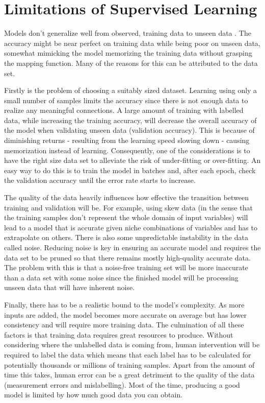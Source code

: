 \documentclass[10pt,a4paper]{report}
\begin{document}
		\section{Limitations of Supervised Learning}
			Models don't generalize well from observed, training data to unseen data \autocite[p. 1-3]{OverfittingSupervisedLearning}. The accuracy might be near perfect
			on training data while being poor on unseen data, somewhat mimicking the model memorizing the training data without grasping the mapping function. 	Many of the reasons for this can be attributed to the data set. \par
			Firstly is the problem of choosing a suitably sized dataset. Learning using only a small number of samples limits the accuracy since there is not enough data to realize
			any meaningful connections. A large amount of training with labelled data, while increasing the training accuracy, will decrease the overall
			accuracy of the model when validating unseen data (validation accuracy). This is because of diminishing returns - resulting from the learning speed slowing down - causing
			memorization instead of learning. Consequently, one of the considerations is to have the right size data set to alleviate the risk of under-fitting or over-fitting. An easy way
			to do this is to train the model in batches and, after each epoch, check the validation accuracy until the error rate starts to increase. \par
			The quality of the data heavily influences how effective the transition between training and validation will be. For example, using skew data (in the sense that
			the training samples don't represent the whole domain of input variables) will lead to a model that is accurate given niche combinations of variables and has to
			extrapolate on others. There is also some unpredictable instability in the data called noise. Reducing noise is key in ensuring an accurate model and requires
			the data set to be pruned so that there remains mostly high-quality accurate data. The problem with this is that a noise-free training set will be more inaccurate than a
			data set with some noise since the finished model will be processing unseen data that will have inherent noise. \par
			Finally, there has to be a realistic bound to the model's complexity. As more inputs are added, the model becomes more accurate on average but has lower consistency and
			will require more training data. The culmination of all these factors is that training data requires great resources to produce. Without considering where the unlabelled data is coming from,
			human intervention will be required to label the data which means that each label has to be calculated for potentially thousands or millions of training samples.
			Apart from the amount of time this takes, human error can be a great detriment to the quality of the data (measurement errors and mislabelling). Most of the time, producing a good
			model is limited by how much good data you can obtain.
\end{document}
